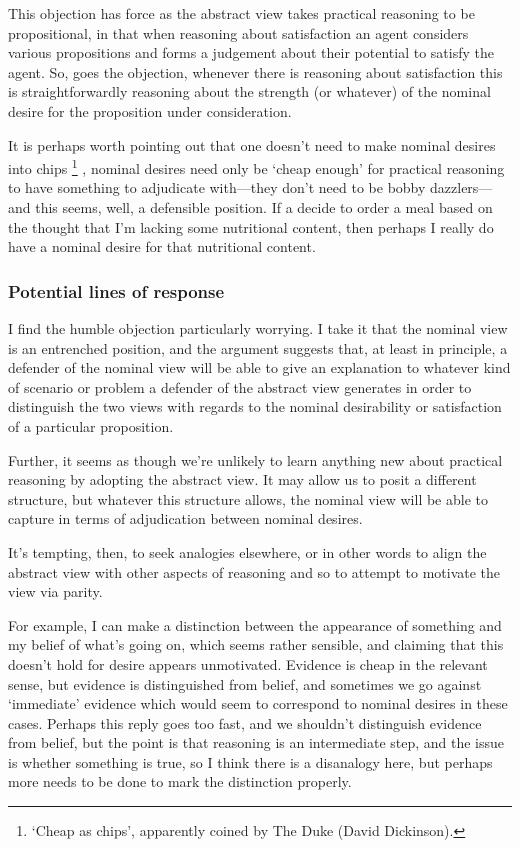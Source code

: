 \documentclass[10pt]{article}
\begin{document}
This objection has force as the abstract view takes practical reasoning to be propositional, in that when reasoning about satisfaction an agent considers various propositions and forms a judgement about their potential to satisfy the agent.
So, goes the objection, whenever there is reasoning about satisfaction this is straightforwardly reasoning about the strength (or whatever) of the nominal desire for the proposition under consideration.

It is perhaps worth pointing out that one doesn't need to make nominal desires into chips\nolinebreak
\footnote{`Cheap as chips', apparently coined by The Duke (David Dickinson).}
, nominal desires need only be `cheap enough' for practical reasoning to have something to adjudicate with---they don't need to be bobby dazzlers---and this seems, well, a defensible position.
If a decide to order a meal based on the thought that I'm lacking some nutritional content, then perhaps I really do have a nominal desire for that nutritional content.

\subsubsection{Potential lines of response}
\label{sec:potent-lines-resp}

I find the humble objection particularly worrying.
I take it that the nominal view is an entrenched position, and the argument suggests that, at least in principle, a defender of the nominal view will be able to give an explanation to whatever kind of scenario or problem a defender of the abstract view generates in order to distinguish the two views with regards to the nominal desirability or satisfaction of a particular proposition.

Further, it seems as though we're unlikely to learn anything new about practical reasoning by adopting the abstract view.
It may allow us to posit a different structure, but whatever this structure allows, the nominal view will be able to capture in terms of adjudication between nominal desires.

It's tempting, then, to seek analogies elsewhere, or in other words to align the abstract view with other aspects of reasoning and so to attempt to motivate the view via parity.

For example, I can make a distinction between the appearance of something and my belief of what's going on, which seems rather sensible, and claiming that this doesn't hold for desire appears unmotivated.
Evidence is cheap in the relevant sense, but evidence is distinguished from belief, and sometimes we go against `immediate' evidence which would seem to correspond to nominal desires in these cases.
Perhaps this reply goes too fast, and we shouldn't distinguish evidence from belief, but the point is that reasoning is an intermediate step, and the issue is whether something is true, so I think there is a disanalogy here, but perhaps more needs to be done to mark the distinction properly.
\end{document}
